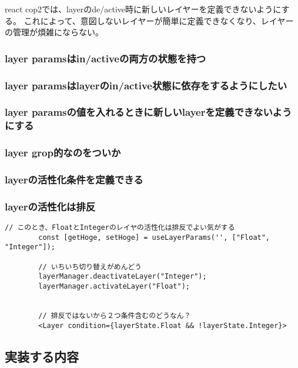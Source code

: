 \documentclass{jsarticle}
\begin{document}
    react cop2では、layerのde/active時に新しいレイヤーを定義できないようにする。
    これによって、意図しないレイヤーが簡単に定義できなくなり、レイヤーの管理が煩雑にならない。


    \subsubsection{layer paramsはin/activeの両方の状態を持つ}

    \subsubsection{layer paramsはlayerのin/active状態に依存をするようにしたい}

    \subsubsection{layer paramsの値を入れるときに新しいlayerを定義できないようにする}

    \subsubsection{layer grop的なのをついか}

    \subsubsection{layerの活性化条件を定義できる}

    \subsubsection{layerの活性化は排反}
        \begin{lstlisting}[caption=hoge,label=fuga]
        // このとき、FloatとIntegerのレイヤの活性化は排反でよい気がする
        const [getHoge, setHoge] = useLayerParams('', ["Float", "Integer"]);

        // いちいち切り替えがめんどう
        layerManager.deactivateLayer("Integer");
        layerManager.activateLayer("Float");


        // 排反ではないから２つ条件含むのどうなん？
        <Layer condition={layerState.Float && !layerState.Integer}>
        \end{lstlisting}

    \subsection{実装する内容}
\end{document}
